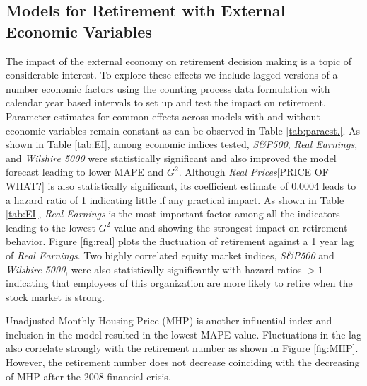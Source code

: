 \documentclass[12pt,letterpaper]{article}
\begin{document}
\subsection{Models for Retirement with External Economic Variables}
   The impact of the external economy on retirement decision making is a topic of considerable interest.  To explore these effects we include lagged versions of a number economic factors using the counting process data formulation with calendar year based intervals to set up and test the impact on retirement. Parameter estimates for common effects across models with and without economic variables remain constant as can be observed in Table \ref{tab:paraest.}.  As shown in Table \ref{tab:EI}, among economic indices tested, {\it S\&P500}, {\it Real Earnings}, and {\it Wilshire 5000} were statistically significant and also improved the model forecast leading to lower MAPE and $G^2$.  Although {\it Real Prices}[PRICE OF WHAT?] is also statistically significant, its coefficient estimate of 0.0004 leads to a hazard ratio of 1 indicating little if any practical impact. As shown in Table \ref{tab:EI}, {\it Real Earnings} is the most important factor among all the indicators leading to the lowest $G^2$ value and showing the strongest impact on retirement behavior.  Figure \ref{fig:real} plots the fluctuation of retirement against a 1 year lag of {\it Real Earnings}. Two highly correlated equity market indices, {\it S\&P500} and {\it Wilshire 5000}, were also statistically significantly with hazard ratios $>1$ indicating that employees of this organization are more likely to retire when the stock market is strong.

   Unadjusted Monthly Housing Price (MHP) is another influential index and inclusion in the model resulted in the lowest MAPE value. Fluctuations in the lag also correlate strongly with the retirement number as shown in Figure \ref{fig:MHP}. However, the retirement number does not decrease coinciding with the decreasing of MHP after the 2008 financial crisis.
\end{document}
